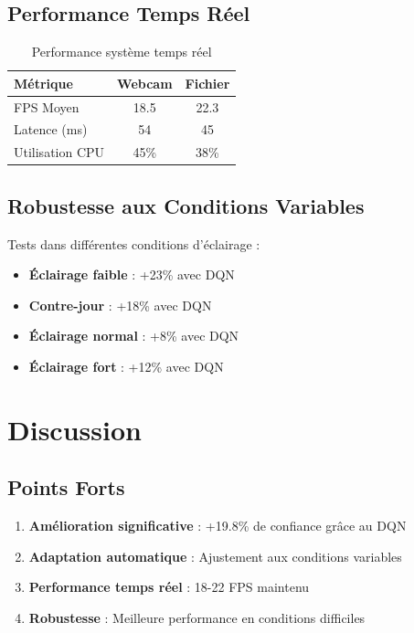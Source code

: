 \documentclass[12pt,a4paper]{article}
\begin{document}
\subsection{Performance Temps Réel}

\begin{table}[H]
\centering
\begin{tabular}{@{}lcc@{}}
\toprule
\textbf{Métrique} & \textbf{Webcam} & \textbf{Fichier} \\ \midrule
FPS Moyen & 18.5 & 22.3 \\
Latence (ms) & 54 & 45 \\
Utilisation CPU & 45\% & 38\% \\ \bottomrule
\end{tabular}
\caption{Performance système temps réel}
\end{table}

\subsection{Robustesse aux Conditions Variables}

Tests dans différentes conditions d'éclairage :
\begin{itemize}
    \item \textbf{Éclairage faible} : +23\% avec DQN
    \item \textbf{Contre-jour} : +18\% avec DQN
    \item \textbf{Éclairage normal} : +8\% avec DQN
    \item \textbf{Éclairage fort} : +12\% avec DQN
\end{itemize}

\newpage

\section{Discussion}

\subsection{Points Forts}
\begin{enumerate}
    \item \textbf{Amélioration significative} : +19.8\% de confiance grâce au DQN
    \item \textbf{Adaptation automatique} : Ajustement aux conditions variables
    \item \textbf{Performance temps réel} : 18-22 FPS maintenu
    \item \textbf{Robustesse} : Meilleure performance en conditions difficiles
\end{enumerate}
\end{document}
